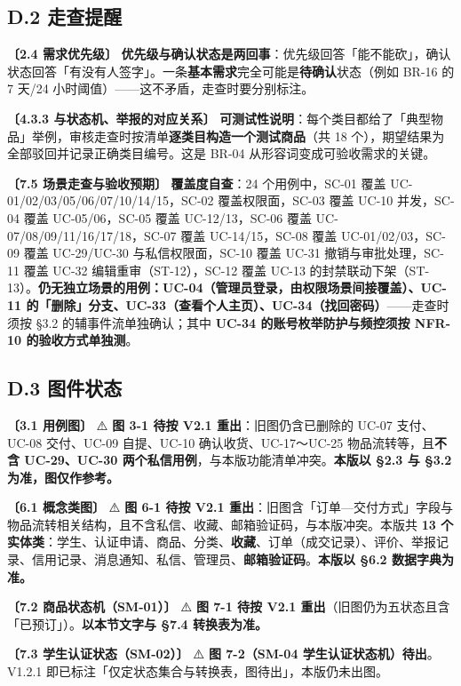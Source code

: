 \documentclass[12pt,a4paper]{ctexart}
\begin{document}
\subsection*{D.2 走查提醒}
{\small\textbf{〔2.4 需求优先级〕} \textbf{优先级与确认状态是两回事}：优先级回答「能不能砍」，确认状态回答「有没有人签字」。一条\textbf{基本需求}完全可能是\textbf{待确认}状态（例如 BR-16 的 7 天/24 小时阈值）——这不矛盾，走查时要分别标注。}\par
\vspace{0.35em}
{\small\textbf{〔4.3.3 与状态机、举报的对应关系〕} \textbf{可测试性说明}：每个类目都给了「典型物品」举例，审核走查时按清单\textbf{逐类目构造一个测试商品}（共 18 个），期望结果为全部驳回并记录正确类目编号。这是 BR-04 从形容词变成可验收需求的关键。}\par
\vspace{0.35em}
{\small\textbf{〔7.5 场景走查与验收预期〕} \textbf{覆盖度自查}：24 个用例中，SC-01 覆盖 UC-01/02/03/05/06/07/10/14/15，SC-02 覆盖权限面，SC-03 覆盖 UC-10 并发，SC-04 覆盖 UC-05/06，SC-05 覆盖 UC-12/13，SC-06 覆盖 UC-07/08/09/11/16/17/18，SC-07 覆盖 UC-14/15，SC-08 覆盖 UC-01/02/03，SC-09 覆盖 UC-29/UC-30 与私信权限面，SC-10 覆盖 UC-31 撤销与审批处理，SC-11 覆盖 UC-32 编辑重审（ST-12），SC-12 覆盖 UC-13 的封禁联动下架（ST-13）。\textbf{仍无独立场景的用例：UC-04（管理员登录，由权限场景间接覆盖）、UC-11 的「删除」分支、UC-33（查看个人主页）、UC-34（找回密码）}——走查时须按 §3.2 的辅事件流单独确认；其中 \textbf{UC-34 的账号枚举防护与频控须按 NFR-10 的验收方式单独测}。}\par
\vspace{0.35em}

\subsection*{D.3 图件状态}
{\small\textbf{〔3.1 用例图〕} ⚠️ \textbf{图 3-1 待按 V2.1 重出}：旧图仍含已删除的 UC-07 支付、UC-08 交付、UC-09 自提、UC-10 确认收货、UC-17～UC-25 物品流转等，且\textbf{不含 UC-29、UC-30 两个私信用例}，与本版功能清单冲突。\textbf{本版以 §2.3 与 §3.2 为准，图仅作参考。}}\par
\vspace{0.35em}
{\small\textbf{〔6.1 概念类图〕} ⚠️ \textbf{图 6-1 待按 V2.1 重出}：旧图含「订单—交付方式」字段与物品流转相关结构，且不含私信、收藏、邮箱验证码，与本版冲突。本版共 \textbf{13 个实体类}：学生、认证申请、商品、分类、\textbf{收藏}、订单（成交记录）、评价、举报记录、信用记录、消息通知、私信、管理员、\textbf{邮箱验证码}。\textbf{本版以 §6.2 数据字典为准。}}\par
\vspace{0.35em}
{\small\textbf{〔7.2 商品状态机（SM-01）〕} ⚠️ \textbf{图 7-1 待按 V2.1 重出}（旧图仍为五状态且含「已预订」）。\textbf{以本节文字与 §7.4 转换表为准。}}\par
\vspace{0.35em}
{\small\textbf{〔7.3 学生认证状态（SM-02）〕} ⚠️ \textbf{图 7-2（SM-04 学生认证状态机）待出}。V1.2.1 即已标注「仅定状态集合与转换表，图待出」，本版仍未出图。}\par
\vspace{0.35em}
\end{document}
